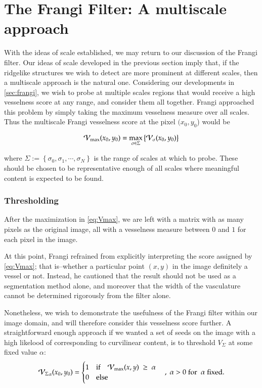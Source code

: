  \chapter{The Frangi Filter: A multiscale approach} \label{sec:frangi-multiscale}
    
     With the ideas of scale established, we may return to our discussion of the Frangi filter.
    Our ideas of scale developed in the previous section imply that, if the ridgelike structures we wish to detect are more prominent at different scales, then a multiscale approach is the natural one. Considering our
    developments in \cref{sec:frangi}, we wish to probe at multiple scales
    regions that would receive a high vesselness score at any range,
    and consider them all together. Frangi \cite{frangi-paper} approached this problem by simply taking the maximum vesselness measure over all scales. Thus the multiscale Frangi vesselness score at the pixel $(x_0, y_0$) would be 
    
    \begin{equation} \label{eq:Vmax}
    \mathcal{V}_{\max}(x_0, y_0) =
    	\underset{\sigma \in \Sigma}{\max}\left\{  \mathcal{V}_{\sigma} (x_0, y_0) \right\}
    \end{equation}
    
    where $\Sigma := \left\{ \sigma_0, \sigma_1 , \cdots, \sigma_N \right\}$ is
    the range of scales at which to probe. These should be chosen to be representative enough of all scales where meaningful content is expected to be found.
    
   
    \subsection{Thresholding}
    
    After the maximization in \cref{eq:Vmax}, we are left with a matrix with as many pixels as the original image, all with a vesselness measure between $0$ and $1$ for each pixel in the image.
       
    At this point, Frangi \cite{frangi-paper} refrained from explicitly interpreting the score assigned by \cref{eq:Vmax}; that is--whether a particular point $(x,y)$ in the image definitely a vessel or not. Instead, he cautioned that the result should not be used as a segmentation method alone, and moreover that the width of the vasculature cannot be determined rigorously from the filter alone.
    
    Nonetheless, we wish to demonstrate the usefulness of the Frangi filter within our image domain, and will therefore consider this vesselness score further. A straightforward enough approach if we wanted a set of seeds on the image with a high likelood of corresponding to curvilinear content, is to threshold $V_\Sigma$ at some fixed value $\alpha$:
    \begin{equation}
    {\ensuremath{\mathcal{V}_{\Sigma}}}_{\alpha}(x_0,y_0) = \begin{cases}
    1 & \textrm{if}\quad \mathcal{V}_{\max}(x,y) \; \ge\;  \alpha \\
    0 & \textrm{else}
    \end{cases}  \quad , \; \alpha > 0
	    \; \textrm{for } \; \alpha \;\textrm{fixed}.
    \end{equation}
    

